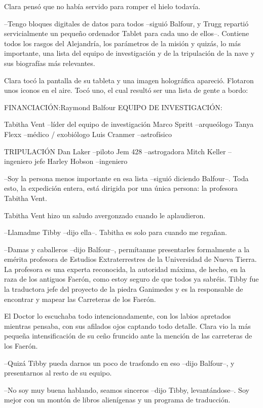 {Clara pensó que no había servido para romper el hielo todavía.}

{--Tengo bloques digitales de datos para todos --siguió Balfour, y Trugg
 repartió servicialmente un pequeño ordenador Tablet para cada uno de
 ellos--. Contiene todos los rasgos del Alejandría, los parámetros de la
 misión y quizás, lo más importante, una lista del equipo de
 investigación y de la tripulación de la nave y sus biografías más
relevantes.}

{Clara tocó la pantalla de su tableta y una imagen holográfica apareció.
 Flotaron unos iconos en el aire. Tocó uno, el cual resultó ser una lista
de gente a bordo:}

{FINANCIACIÓN:\@ Raymond Balfour}
{EQUIPO DE INVESTIGACIÓN:}

{Tabitha Vent --líder del equipo de investigación}
{Marco Spritt --arqueólogo}
{Tanya Flexx --médico / exobiólogo}
{Luis Cranmer --astrofísico}

{TRIPULACIÓN}
{Dan Laker --piloto}
{Jem 428 --astrogadora}
{Mitch Keller --ingeniero jefe}
{Harley Hobson --ingeniero}

{--Soy la persona menos
 importante en esa lista --siguió diciendo Balfour--. Toda esto, la
 expedición entera, está dirigida por una única persona: la profesora
Tabitha Vent.}

{Tabitha Vent hizo un saludo avergonzado cuando le aplaudieron.}

{--Llamadme Tibby --dijo ella--. Tabitha es solo para cuando me
regañan.}

{--Damas y caballeros --dijo Balfour--, permítanme presentarles
 formalmente a la emérita profesora de Estudios Extraterrestres de la
 Universidad de Nueva Tierra. La profesora es una experta reconocida, la
 autoridad máxima, de hecho, en la raza de los antiguos Faerón, como
 estoy seguro de que todos ya sabréis. Tibby fue la traductora jefe del
 proyecto de la piedra Ganimedes y es la responsable de encontrar y
mapear las Carreteras de los Faerón.}

{El Doctor lo escuchaba todo intencionadamente, con los labios apretados
 mientras pensaba, con sus afilados ojos captando todo detalle. Clara vio
 la más pequeña intensificación de su ceño fruncido ante la mención de
las carreteras de los Faerón.}

{--Quizá Tibby pueda darnos un poco de trasfondo en eso --dijo Balfour--,
y presentarnos al resto de su equipo.}

{--No soy muy buena hablando, seamos sinceros --dijo Tibby,
 levantándose--. Soy mejor con un montón de libros alienígenas y un
programa de traducción.}

